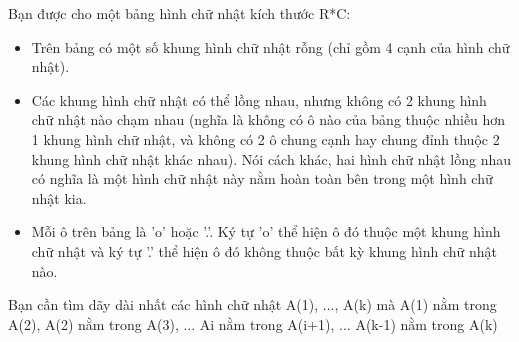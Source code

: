 Bạn được cho một bảng hình chữ nhật kích thước R*C:
\begin{itemize}
	\item Trên bảng có một số khung hình chữ nhật rỗng (chỉ gồm 4 cạnh của hình chữ nhật).
	\item Các khung hình chữ nhật có thể lồng nhau, nhưng không có 2 khung hình chữ nhật nào chạm nhau (nghĩa là không có ô nào của bảng thuộc nhiều hơn 1 khung hình chữ nhật, và không có 2 ô chung cạnh hay chung đỉnh thuộc 2 khung hình chữ nhật khác nhau). Nói cách khác, hai hình chữ nhật lồng nhau có nghĩa là một hình chữ nhật này nằm hoàn toàn bên trong một hình chữ nhật kia.
	\item Mỗi ô trên bảng là 'o' hoặc '.'. Ký tự 'o' thể hiện ô đó thuộc một khung hình chữ nhật và ký tự '.' thể hiện ô đó không thuộc bất kỳ khung hình chữ nhật nào.
\end{itemize}

Bạn cần tìm dãy dài nhất các hình chữ nhật A(1), ..., A(k) mà A(1) nằm trong A(2), A(2) nằm trong A(3), ... Ai nằm trong A(i+1), ... A(k-1) nằm trong A(k)